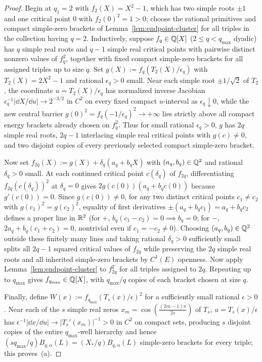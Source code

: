 \begin{proof}
Begin at $q_1=2$ with $f_2(X)=X^2-1$, which has two simple roots $\pm 1$ and one critical point $0$ with $f_2(0)^2=1>0$; choose the rational primitives and compact simple-zero brackets of Lemma~\ref{lem:endpoint-cluster} for all triples in the collection having $q=2$. Inductively, suppose $f_q\in\mathbb{Q}[X]$ ($2\le q<q_{\max}$ dyadic) has $q$ simple real roots and $q-1$ simple real critical points with pairwise distinct nonzero values of $f_q^2$, together with fixed compact simple-zero brackets for all assigned triples up to size $q$. Set $g(X):=f_q(T_2(X)/\epsilon_q)$ with $T_2(X)=2X^2-1$ and rational $\epsilon_q>0$ small. Near each simple root $\pm 1/\sqrt{2}$ of $T_2$, the coordinate $u=T_2(X)/\epsilon_q$ has normalized inverse Jacobian $\epsilon_q^{-1}|\dd X/\dd u|\to 2^{-3/2}$ in $C^2$ on every fixed compact $u$-interval as $\epsilon_q\downarrow 0$, while the new central barrier $g(0)^2=f_q(-1/\epsilon_q)^2\to+\infty$ lies strictly above all compact energy brackets already chosen on $f_q^2$. Thus for small rational $\epsilon_q>0$, $g$ has $2q$ simple real roots, $2q-1$ interlacing simple real critical points with $g(c)\ne 0$, and two disjoint copies of every previously selected compact simple-zero bracket.

Now set $f_{2q}(X):=g(X)+\delta_q(a_q+b_q X)$ with $(a_q,b_q)\in\mathbb{Q}^2$ and rational $\delta_q>0$ small. At each continued critical point $c(\delta_q)$ of $f_{2q}$, differentiating $f_{2q}(c(\delta_q))^2$ at $\delta_q=0$ gives $2g(c(0))(a_q+b_q c(0))$ because $g'(c(0))=0$. Since $g(c(0))\ne 0$, for any two distinct critical points $c_1\ne c_2$ with $g(c_1)^2=g(c_2)^2$, equality of first derivatives $\pm(a_q+b_q c_1)=a_q+b_q c_2$ defines a proper line in $\mathbb{R}^2$ (for $+$, $b_q(c_1-c_2)=0\implies b_q=0$; for $-$, $2a_q+b_q(c_1+c_2)=0$, nontrivial even if $c_1=-c_2\ne 0$). Choosing $(a_q,b_q)\in\mathbb{Q}^2$ outside these finitely many lines and taking rational $\delta_q>0$ sufficiently small splits all $2q-1$ squared critical values of $f_{2q}$ while preserving the $2q$ simple real roots and all inherited simple-zero brackets by $C^1(E)$ openness. Now apply Lemma~\ref{lem:endpoint-cluster} to $f_{2q}^2$ for all triples assigned to $2q$. Repeating up to $q_{\max}$ gives $f_{q_{\max}}\in\mathbb{Q}[X]$, with $q_{\max}/q$ copies of each bracket chosen at size $q$.

Finally, define $W(x):=f_{q_{\max}}(T_s(x)/\epsilon)^2$ for a sufficiently small rational $\epsilon>0$. Near each of the $s$ simple real zeros $x_m=\cos(\frac{(2m-1)\pi}{2s})$ of $T_s$, $u=T_s(x)/\epsilon$ has $\epsilon^{-1}|\dd x/\dd u|\to |T_s'(x_m)|^{-1}>0$ in $C^2$ on compact sets, producing $s$ disjoint copies of the entire $q_{\max}$-well hierarchy and hence $(s q_{\max}/q)B_{q,\alpha}(L)=(X_*/q)B_{q,\alpha}(L)$ simple-zero brackets for every triple; this proves~(a).


\end{proof}
